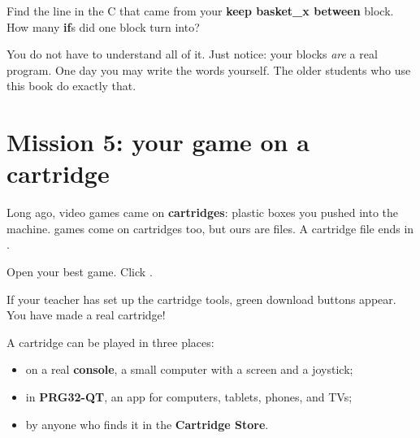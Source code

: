 \begin{prgtry}
Find the line in the C that came from your \textbf{keep basket\_x between}
block. How many \textbf{if}s did one block turn into?
\end{prgtry}

You do not have to understand all of it. Just notice: your blocks \emph{are} a
real program. One day you may write the words yourself. The older students who
use this book do exactly that.

\section{Mission 5: your game on a cartridge}

Long ago, video games came on \textbf{cartridges}: plastic boxes you pushed
into the machine. \prg games come on cartridges too, but ours are files. A \prg
cartridge file ends in .

\begin{prgmission}
Open your best game. Click .

If your teacher has set up the cartridge tools, green download buttons appear.
You have made a real cartridge!
\end{prgmission}

\begin{center}
\end{center}

A cartridge can be played in three places:

\begin{itemize}
  \item on a real \textbf{\prg console}, a small computer with a screen and a
        joystick;
  \item in \textbf{PRG32-QT}, an app for computers, tablets, phones, and TVs;
  \item by anyone who finds it in the \textbf{Cartridge Store}.
\end{itemize}


